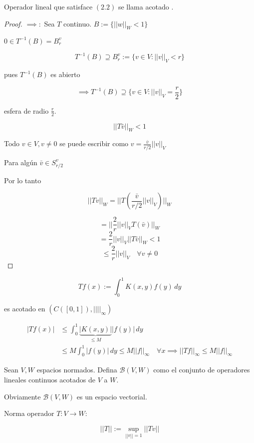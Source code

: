 \begin{fdefinition}
    Operador lineal que satisface $(2.2)$ se llama \color{red} acotado \color{black}.
\end{fdefinition}

\begin{proof}
    $\implies:$ Sea $T$ continuo. $B:=\{||w||_W<1\}$

    $0\in T^{-1}(B)=B_r^v$

    \[T^{-1}(B)\supseteq B_r^v:=\{v\in V:||v||_V<r\}\]

    pues $T^{-1}(B)$ es abierto 

    \[\implies T^{-1}(B)\supseteq \{v\in V:||v||_V=\frac{r}{2}\}\]

    esfera de radio $\frac{r}{2}$.

    \[||T\bar v||_W<1\]

    Todo $v\in V,v\neq 0$ se puede escribir como $v=\frac{\bar v}{r/2}||v||_V$

    Para algún $\bar v\in S_{r/2}^v$

    Por lo tanto

    \[||Tv||_W=||T(\frac{\bar v }{r/2}||v||_V)||_W\]

    \[=||\frac{2}{r}||v||_V T(\bar v)||_W\]
    \[=\frac{2}{r}||v||_V ||T\bar v||_W<1\]
    \[\leq \frac{2}{r}||v||_V\quad \forall v\neq 0\]
\end{proof}

\begin{fexample}
    \[Tf(x):=\int_0^1 K(x,y)f(y)\,dy\]

    es acotado en $(C([0,1]),||||_\infty )$

    \begin{align*}|Tf(x)|&\leq \int_0^1 \underbrace{|K(x,y)|}_{\leq M}|f(y)|\,dy\\
    &\leq M\int_0^1 |f(y)|\,dy\leq M ||f||_\infty\quad \forall x\implies ||Tf||_\infty \leq M||f||_\infty\end{align*}
\end{fexample}

\begin{fdefinition}
    Sean $V,W$ espacios normados. Defina $\mathcal{B}(V,W)$ como el conjunto de operadores lineales continuos acotados de $V$ a $W$.

    Obviamente $\mathcal{B}(V,W)$ es un espacio vectorial.
\end{fdefinition}

Norma operador $T:V\to W$:

\[||T||:=\sup_{||v||=1} ||Tv||\]

